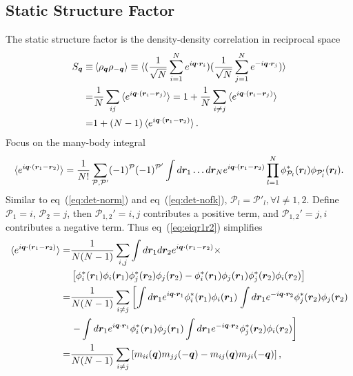 \subsection{Static Structure Factor}

The static structure factor is the density-density correlation in reciprocal space
\begin{align}
S_{\boldsymbol{q}} \equiv& \braket{\rho_{\boldsymbol{q}}\rho_{-\boldsymbol{q}}} \equiv \braket{
(\frac{1}{\sqrt{N}}\sum\limits_{i=1}^N e^{i\boldsymbol{q}\cdot\boldsymbol{r}_i})
(\frac{1}{\sqrt{N}}\sum\limits_{j=1}^N e^{-i\boldsymbol{q}\cdot\boldsymbol{r}_j})
} \nonumber \\
=& \frac{1}{N}\sum_{ij}\braket{e^{i\boldsymbol{q}\cdot(\boldsymbol{r}_i-\boldsymbol{r}_j)}} =
1 + \frac{1}{N}\sum_{i\neq j}\braket{e^{i\boldsymbol{q}\cdot(\boldsymbol{r}_i-\boldsymbol{r}_j)}} \nonumber \\
=& 1+(N-1)\braket{e^{i\boldsymbol{q}\cdot(\boldsymbol{r}_1-\boldsymbol{r}_2)}}.
\end{align}
Focus on the many-body integral
\begin{align}
\braket{e^{i\boldsymbol{q}\cdot(\boldsymbol{r}_1-\boldsymbol{r}_2)}} = \dfrac{1}{N!} \sum\limits_{\mathcal{P},\mathcal{P'}} 
(-1)^{\mathcal{P}} (-1)^{\mathcal{P'}} \int d\boldsymbol{r}_1\dots d\boldsymbol{r}_N
e^{i\boldsymbol{q}\cdot(\boldsymbol{r}_1-\boldsymbol{r}_2)}
\prod\limits_{l=1}^{N} \phi^*_{\mathcal{P}_l}(\boldsymbol{r}_l)\phi_{\mathcal{P}_l'}(\boldsymbol{r}_l). \label{eq:eiqr1r2}
\end{align}
Similar to eq~(\ref{eq:det-norm}) and eq~(\ref{eq:det-nofk}), $\mathcal{P}_l=\mathcal{P}'_l, \forall l\neq1, 2$. Define $\mathcal{P}_1=i$, $\mathcal{P}_2=j$, then $\mathcal{P}_{1,2}'=i, j$ contributes a positive term, and $\mathcal{P}_{1,2}'=j, i$ contributes a negative term. Thus eq~(\ref{eq:eiqr1r2}) simplifies
\begin{align}
\braket{e^{i\boldsymbol{q}\cdot(\boldsymbol{r}_1-\boldsymbol{r}_2)}} =& \dfrac{1}{N(N-1)} \sum\limits_{i, j}
 \int d\boldsymbol{r}_1d\boldsymbol{r}_2
e^{i\boldsymbol{q}\cdot(\boldsymbol{r}_1-\boldsymbol{r}_2)} \times \nonumber \\
&\left[
\phi^*_{i}(\boldsymbol{r}_1)\phi_{i}(\boldsymbol{r}_1)\phi^*_{j}(\boldsymbol{r}_2)\phi_{j}(\boldsymbol{r}_2) - 
\phi^*_{i}(\boldsymbol{r}_1)\phi_{j}(\boldsymbol{r}_1)\phi^*_{j}(\boldsymbol{r}_2)\phi_{i}(\boldsymbol{r}_2)
\right] \nonumber \\
=& \dfrac{1}{N(N-1)} \sum\limits_{i\neq j} \left[
\int d\boldsymbol{r}_1 e^{i\boldsymbol{q}\cdot\boldsymbol{r}_1} \phi^*_{i}(\boldsymbol{r}_1)\phi_{i}(\boldsymbol{r}_1) \right.
\int d\boldsymbol{r}_1 e^{-i\boldsymbol{q}\cdot\boldsymbol{r}_2} \phi^*_{j}(\boldsymbol{r}_2)\phi_{j}(\boldsymbol{r}_2) \nonumber \\
& \left. - \int d\boldsymbol{r}_1 e^{i\boldsymbol{q}\cdot\boldsymbol{r}_1} \phi^*_{i}(\boldsymbol{r}_1)\phi_{j}(\boldsymbol{r}_1)
\int d\boldsymbol{r}_1 e^{-i\boldsymbol{q}\cdot\boldsymbol{r}_2} \phi^*_{j}(\boldsymbol{r}_2)\phi_{i}(\boldsymbol{r}_2)
\right] \nonumber \\
=& \dfrac{1}{N(N-1)} \sum\limits_{i\neq j} \left[
m_{ii}(\boldsymbol{q})m_{jj}(-\boldsymbol{q}) - m_{ij}(\boldsymbol{q})m_{ji}(-\boldsymbol{q})
\right],
\end{align}
